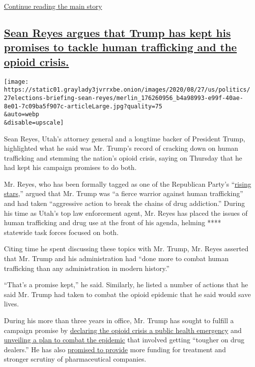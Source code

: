 \protect\hyperlink{after-dfp-ad-mid6}{Continue reading the main story}

\hypertarget{sean-reyes-argues-that-trump-has-kept-his-promises-to-tackle-human-trafficking-and-the-opioid-crisis}{%
\subsection{\texorpdfstring{\protect\hyperlink{sean-reyes-argues-that-trump-has-kept-his-promises-to-tackle-human-trafficking-and-the-opioid-crisis}{Sean
Reyes argues that Trump has kept his promises to tackle human
trafficking and the opioid
crisis.}}{Sean Reyes argues that Trump has kept his promises to tackle human trafficking and the opioid crisis.}}\label{sean-reyes-argues-that-trump-has-kept-his-promises-to-tackle-human-trafficking-and-the-opioid-crisis}}

\texttt{[image: https://static01.graylady3jvrrxbe.onion/images/2020/08/27/us/politics/27elections-briefing-sean-reyes/merlin\_176260956\_b4a98993-e99f-40ae-8e01-7c09ba5f907c-articleLarge.jpg?quality=75\\\&auto=webp\\\&disable=upscale]}

Sean Reyes, Utah's attorney general and a longtime backer of President
Trump, highlighted what he said was Mr. Trump's record of cracking down
on human trafficking and stemming the nation's opioid crisis, saying on
Thursday that he had kept his campaign promises to do both.

Mr. Reyes, who has been formally tagged as one of the Republican Party's
``\href{https://www.gop.com/rnc-announces-winter-meeting-2015-rising-stars/}{rising
stars},'' argued that Mr. Trump was ``a fierce warrior against human
trafficking'' and had taken ``aggressive action to break the chains of
drug addiction.'' During his time as Utah's top law enforcement agent,
Mr. Reyes has placed the issues of human trafficking and drug use at the
front of his agenda, helming **** statewide task forces focused on both.

Citing time he spent discussing these topics with Mr. Trump, Mr. Reyes
asserted that Mr. Trump and his administration had ``done more to combat
human trafficking than any administration in modern history.''

``That's a promise kept,'' he said. Similarly, he listed a number of
actions that he said Mr. Trump had taken to combat the opioid epidemic
that he said would save lives.

During his more than three years in office, Mr. Trump has sought to
fulfill a campaign promise by
\href{https://www.nytimes3xbfgragh.onion/2017/10/26/us/politics/trump-opioid-crisis.html}{declaring
the opioid crisis a public health emergency} and
\href{https://www.nytimes3xbfgragh.onion/2018/03/19/us/politics/trump-new-hampshire-opioid-plan.html}{unveiling
a plan to combat the epidemic} that involved getting ``tougher on drug
dealers.'' He has also
\href{https://www.nytimes3xbfgragh.onion/2019/04/24/us/politics/trump-opioid-crisis.html}{promised
to provide} more funding for treatment and stronger scrutiny of
pharmaceutical companies.

